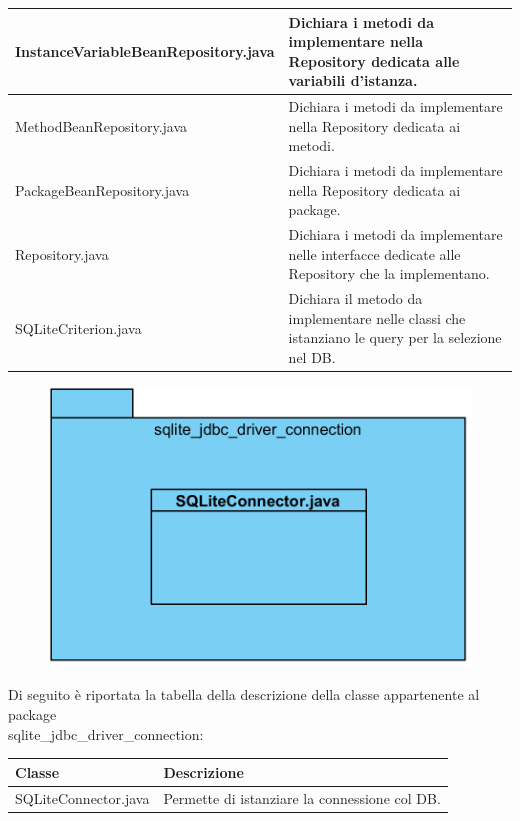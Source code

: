 \documentclass[11pt]{article}
\begin{document}
\begin{description}
\begin{tabular}{|p{}|p{}|}
					\hline
					InstanceVariableBeanRepository.java & Dichiara i metodi da implementare nella Repository dedicata alle variabili d'istanza. \\
					\hline
					MethodBeanRepository.java & Dichiara i metodi da implementare nella Repository dedicata ai metodi. \\
					\hline
					PackageBeanRepository.java & Dichiara i metodi da implementare nella Repository dedicata ai package. \\
					\hline
					Repository.java & Dichiara i metodi da implementare nelle interfacce dedicate alle Repository che la implementano.\\
					\hline	
					SQLiteCriterion.java & Dichiara il metodo da implementare
					nelle classi che istanziano le query per la selezione nel DB. \\
					\hline				
				\end{tabular}	
				\item[ 2.1.5.3 Package sqlite\_jdbc\_driver\_connection] 
				\item \begin{figure}[!h]
					\centering
					\includegraphics{diagrams/SQLite_JDBC_Driver_ConnectionPackageDiagram}
				\end{figure}
				Di seguito è riportata la tabella della descrizione della classe appartenente al package\\sqlite\_jdbc\_driver\_connection:
				\item \begin{tabular}{|p{}|p{}|}
					\hline
					\textbf{Classe} & \textbf{Descrizione}\\
					\hline
					SQLiteConnector.java & Permette di istanziare la connessione col DB. \\
					\hline
				\end{tabular}
			\end{description}
		
\end{document}
